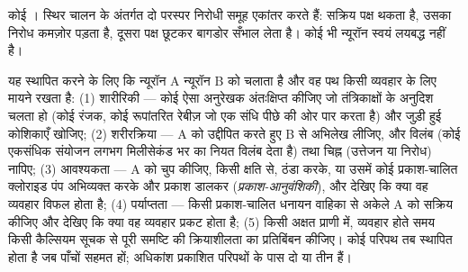 \begin{omfigure}

{\small कोई । स्थिर चालन के अंतर्गत दो परस्पर निरोधी
समूह एकांतर करते हैं: सक्रिय पक्ष थकता है, उसका निरोध कमज़ोर पड़ता है,
दूसरा पक्ष छूटकर बागडोर सँभाल लेता है। कोई भी न्यूरॉन स्वयं लयबद्ध
नहीं है।}
\end{omfigure}

\begin{method}[किसी परिपथ का अनुरेखण]\label{met:b3:nervous-systems:tracing}
यह स्थापित करने के लिए कि न्यूरॉन A न्यूरॉन B को चलाता है और वह पथ किसी
व्यवहार के लिए मायने रखता है: (1) शारीरिकी --- कोई ऐसा अनुरेखक
अंतःक्षिप्त कीजिए जो तंत्रिकाक्षों के अनुदिश चलता हो (कोई रंजक, कोई
रूपांतरित रेबीज़  जो एक संधि पीछे की ओर पार करता है) और जुड़ी हुई
कोशिकाएँ खोजिए; (2) शरीरक्रिया --- A को उद्दीपित करते हुए B से अभिलेख
लीजिए, और विलंब (कोई एकसंधिक संयोजन लगभग मिलीसेकंड भर का नियत विलंब
देता है) तथा चिह्न (उत्तेजन या निरोध) नापिए; (3) आवश्यकता --- A को
चुप कीजिए, किसी क्षति से, ठंडा करके, या उसमें कोई प्रकाश-चालित
क्लोराइड पंप अभिव्यक्त करके और प्रकाश डालकर (\emph{प्रकाश-आनुवंशिकी}),
और देखिए कि क्या वह व्यवहार विफल होता है; (4) पर्याप्तता --- किसी
प्रकाश-चालित धनायन वाहिका से अकेले A को सक्रिय कीजिए और देखिए कि क्या
वह व्यवहार प्रकट होता है; (5) किसी अक्षत प्राणी में, व्यवहार होते समय
किसी कैल्सियम सूचक से पूरी समष्टि की क्रियाशीलता का प्रतिबिंबन कीजिए।
कोई परिपथ तब स्थापित होता है जब पाँचों सहमत हों; अधिकांश प्रकाशित
परिपथों के पास दो या तीन हैं।
\end{method}

